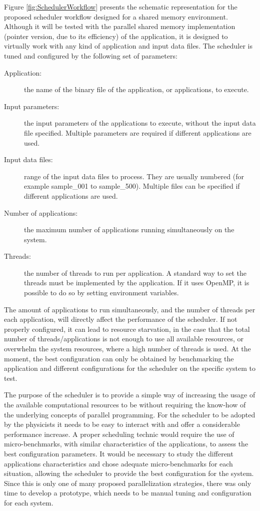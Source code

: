 Figure \ref{fig:SchedulerWorkflow} presents the schematic representation for the proposed scheduler workflow designed for a shared memory environment. Although it will be tested with the parallel shared memory implementation (pointer version, due to its efficiency) of the \tth application, it is designed to virtually work with any kind of application and input data files. The scheduler is tuned and configured by the following set of parameters:

\begin{description}
	\item[Application:] the name of the binary file of the application, or applications, to execute.
	\item[Input parameters:] the input parameters of the applications to execute, without the input data file specified. Multiple parameters are required if different applications are used.
	\item[Input data files:] range of the input data files to process. They are usually numbered (for example sample\_001 to sample\_500). Multiple files can be specified if different applications are used.
	\item[Number of applications:] the maximum number of applications running simultaneously on the system.
	\item[Threads:] the number of threads to run per application. A standard way to set the threads must be implemented by the application. If it uses OpenMP, it is possible to do so by setting environment variables.
\end{description}

The amount of applications to run simultaneously, and the number of threads per each application, will directly affect the performance of the scheduler. If not properly configured, it can lead to resource starvation, in the case that the total number of threads/applications is not enough to use all available resources, or overwhelm the system resources, where a high number of threads is used. At the moment, the best configuration can only be obtained by benchmarking the application and different configurations for the scheduler on the specific system to test.

The purpose of the scheduler is to provide a simple way of increasing the usage of the available computational resources to be without requiring the know-how of the underlying concepts of parallel programming. For the scheduler to be adopted by the physicists it needs to be easy to interact with and offer a considerable performance increase. A proper scheduling technic would require the use of micro-benchmarks, with similar characteristics of the applications, to assess the best configuration parameters. It would be necessary to study the different applications characteristics and chose adequate micro-benchmarks for each situation, allowing the scheduler to provide the best configuration for the system. Since this is only one of many proposed parallelization strategies, there was only time to develop a prototype, which needs to be manual tuning and configuration for each system.

